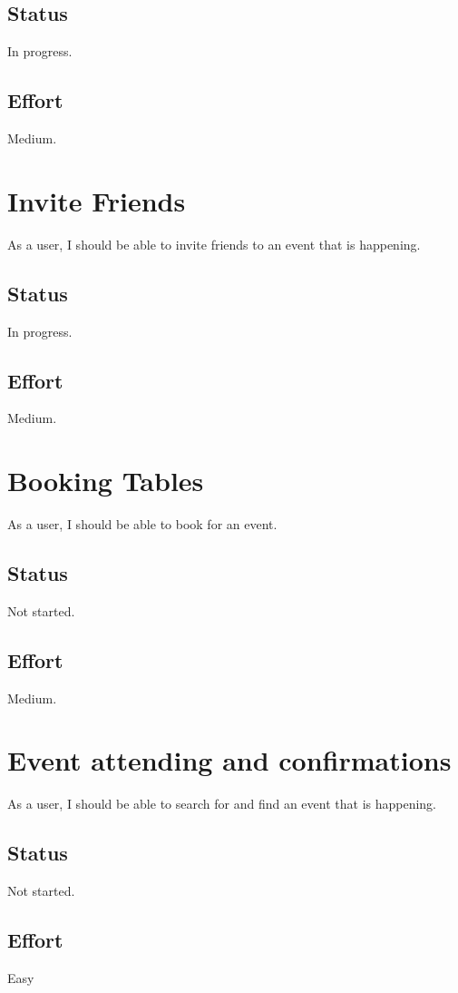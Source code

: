 \documentclass[10pt,a4paper]{article}
\begin{document}
\subsection{Status}
In progress.

\subsection{Effort}
Medium.

\section{Invite Friends}
As a user, I should be able to invite friends to an event that is happening.
\subsection{Status}
In progress.

\subsection{Effort}
Medium.

\section{Booking Tables}
As a user, I should be able to book for an event.
\subsection{Status}
Not started.

\subsection{Effort}
Medium.

\section{Event attending and confirmations}
As a user, I should be able to search for and find an event that is happening.
\subsection{Status}
Not started.

\subsection{Effort}
Easy
\end{document}
